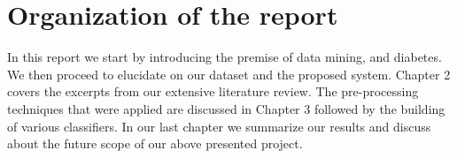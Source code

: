 \section{Organization of the report}
In this report we start by introducing the premise of data mining, and diabetes. We then proceed to elucidate on our dataset and the proposed system. Chapter 2 covers the excerpts from our extensive literature review. The pre-processing techniques that were applied are discussed in Chapter 3 followed by the building of various classifiers. In our last chapter we summarize our results and discuss about the future scope of our above presented project.

